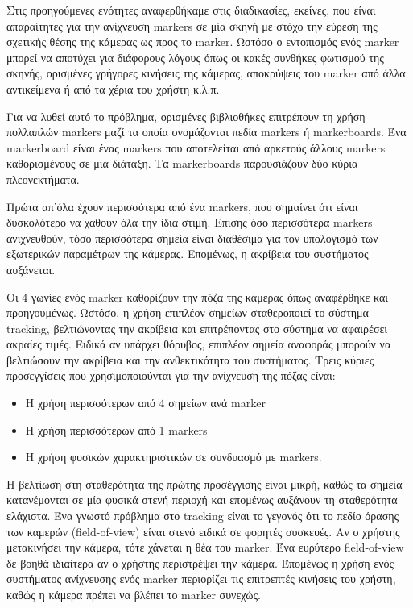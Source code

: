 Στις προηγούμενες ενότητες αναφερθήκαμε στις διαδικασίες, εκείνες, που είναι απαραίτητες για την ανίχνευση markers σε μία σκηνή με στόχο την εύρεση της σχετικής θέσης της κάμερας ως προς το marker. Ωστόσο ο εντοπισμός ενός marker μπορεί να αποτύχει για διάφορους λόγους όπως οι κακές συνθήκες φωτισμού της σκηνής, ορισμένες γρήγορες κινήσεις της κάμερας, αποκρύψεις του marker από άλλα αντικείμενα ή από τα χέρια του χρήστη κ.λ.π. 



Για να λυθεί αυτό το πρόβλημα, ορισμένες βιβλιοθήκες επιτρέπουν τη χρήση πολλαπλών markers μαζί τα οποία ονομάζονται πεδία markers ή markerboards. Ένα markerboard είναι ένας markers που αποτελείται από αρκετούς άλλους markers καθορισμένους σε μία διάταξη. Τα markerboards παρουσιάζουν δύο κύρια πλεονεκτήματα. 

Πρώτα απ'όλα έχουν περισσότερα από ένα markers, που σημαίνει ότι είναι δυσκολότερο να χαθούν όλα την ίδια στιμή. Επίσης όσο περισσότερα markers ανιχνευθούν, τόσο περισσότερα σημεία είναι διαθέσιμα για τον υπολογισμό των εξωτερικών παραμέτρων της κάμερας.
Επομένως, η ακρίβεια του συστήματος αυξάνεται. 


Οι 4 γωνίες ενός marker καθορίζουν την πόζα της κάμερας όπως αναφέρθηκε και προηγουμένως. Ωστόσο, η χρήση επιπλέον σημείων σταθεροποιεί το σύστημα tracking, βελτιώνοντας την ακρίβεια και επιτρέποντας στο σύστημα να αφαιρέσει ακραίες τιμές. Ειδικά αν υπάρχει θόρυβος, επιπλέον σημεία αναφοράς μπορούν να βελτιώσουν την ακρίβεια και την ανθεκτικότητα του συστήματος. Τρεις κύριες προσεγγίσεις που χρησιμοποιούνται για την ανίχνευση της πόζας είναι:

\begin{itemize}
\item Η χρήση περισσότερων από 4 σημείων ανά marker
\item Η χρήση περισσότερων από 1 markers
\item Η χρήση φυσικών χαρακτηριστικών σε συνδυασμό με markers.
\end{itemize}


Η βελτίωση στη σταθερότητα της πρώτης προσέγγισης είναι μικρή, καθώς τα σημεία κατανέμονται σε μία φυσικά στενή περιοχή και επομένως αυξάνουν τη σταθερότητα ελάχιστα. Ένα γνωστό πρόβλημα στο tracking είναι το γεγονός ότι το πεδίο όρασης των καμερών (field-of-view) είναι στενό ειδικά σε φορητές συσκευές. Αν ο χρήστης μετακινήσει την κάμερα, τότε χάνεται η θέα του marker. Ένα ευρύτερο field-of-view δε βοηθά ιδιαίτερα αν ο χρήστης περιστρέψει την κάμερα. Έπομένως η χρήση ενός συστήματος ανίχνευσης ενός marker περιορίζει τις επιτρεπτές κινήσεις του χρήστη, καθώς η κάμερα πρέπει να βλέπει το marker συνεχώς.

